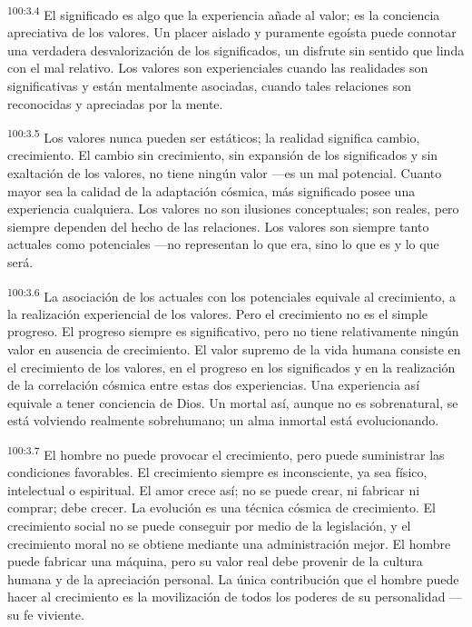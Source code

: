\par
\textsuperscript{100:3.4} El significado es algo que la experiencia añade al valor; es la conciencia apreciativa de los valores. Un placer aislado y puramente egoísta puede connotar una verdadera desvalorización de los significados, un disfrute sin sentido que linda con el mal relativo. Los valores son experienciales cuando las realidades son significativas y están mentalmente asociadas, cuando tales relaciones son reconocidas y apreciadas por la mente.

\par
\textsuperscript{100:3.5} Los valores nunca pueden ser estáticos; la realidad significa cambio, crecimiento. El cambio sin crecimiento, sin expansión de los significados y sin exaltación de los valores, no tiene ningún valor ---es un mal potencial. Cuanto mayor sea la calidad de la adaptación cósmica, más significado posee una experiencia cualquiera. Los valores no son ilusiones conceptuales; son reales, pero siempre dependen del hecho de las relaciones. Los valores son siempre tanto actuales como potenciales ---no representan lo que era, sino lo que es y lo que será.

\par
\textsuperscript{100:3.6} La asociación de los actuales con los potenciales equivale al crecimiento, a la realización experiencial de los valores. Pero el crecimiento no es el simple progreso. El progreso siempre es significativo, pero no tiene relativamente ningún valor en ausencia de crecimiento. El valor supremo de la vida humana consiste en el crecimiento de los valores, en el progreso en los significados y en la realización de la correlación cósmica entre estas dos experiencias. Una experiencia así equivale a tener conciencia de Dios. Un mortal así, aunque no es sobrenatural, se está volviendo realmente sobrehumano; un alma inmortal está evolucionando.

\par
\textsuperscript{100:3.7} El hombre no puede provocar el crecimiento, pero puede suministrar las condiciones favorables. El crecimiento siempre es inconsciente, ya sea físico, intelectual o espiritual. El amor crece así; no se puede crear, ni fabricar ni comprar; debe crecer. La evolución es una técnica cósmica de crecimiento. El crecimiento social no se puede conseguir por medio de la legislación, y el crecimiento moral no se obtiene mediante una administración mejor. El hombre puede fabricar una máquina, pero su valor real debe provenir de la cultura humana y de la apreciación personal. La única contribución que el hombre puede hacer al crecimiento es la movilización de todos los poderes de su personalidad ---su fe viviente.

